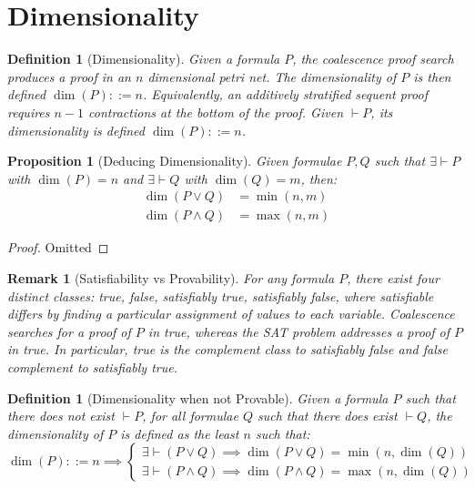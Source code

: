 \documentclass{article}
\def\defeq{::=}
\theoremstyle{indented}
\newtheorem{definition}[sec-ctr]{Definition}
\newtheorem{proposition}[sec-ctr]{Proposition}
\newtheorem*{remark*}{Remark}
\begin{document}


    \section{Dimensionality}
        
        \begin{definition}[Dimensionality]
            Given a formula $P$, the coalescence proof search produces a proof in an $n$ dimensional petri net.
            The dimensionality of $P$ is then defined $\dim(P) \defeq n$.
            Equivalently, an additively stratified sequent proof requires $n - 1$ contractions at the bottom of the proof.
            Given $\vdash P$, its dimensionality is defined $\dim(P) \defeq n$.
        \end{definition}

        \begin{proposition}[Deducing Dimensionality]
            Given formulae $P, Q$ such that $\exists \vdash P$ with $\dim(P) = n$ and $\exists \vdash Q$ with $\dim(Q) = m$, then:
            \begin{align*}
                \dim(P \vee Q) &= \min(n, m) \\
                \dim(P \wedge Q) &= \max(n, m)
            \end{align*}
        \end{proposition}

        \begin{proof}
            Omitted
        \end{proof}


        \begin{remark*}[Satisfiability vs Provability]
            For any formula $P$, there exist four distinct classes: \textit{true, false, satisfiably true, satisfiably false}, where satisfiable differs by finding a particular assignment of values to each variable.
            Coalescence searches for a proof of $P$ in \textit{true}, whereas the SAT problem addresses a proof of $P$ in \textit{true}.
            In particular, \textit{true} is the complement class to \textit{satisfiably false} and \textit{false} complement to \textit{satisfiably true}. %
        \end{remark*}
        
        
        \begin{definition}[Dimensionality when not Provable]
            Given a formula $P$ such that there does not exist $\vdash P$, for all formulae $Q$ such that there does exist $\vdash Q$, the dimensionality of $P$ is defined as the least $n$ such that:
            \begin{equation*}
                \dim(P) \defeq n \implies 
                \begin{cases}
                    \exists \vdash (P \vee Q) \implies \dim(P \vee Q) = \min(n, \dim(Q)) \\
                    \exists \vdash (P \wedge Q) \implies \dim(P \wedge Q) = \max(n, \dim(Q))
                \end{cases}
            \end{equation*}
        \end{definition}
\end{document}
